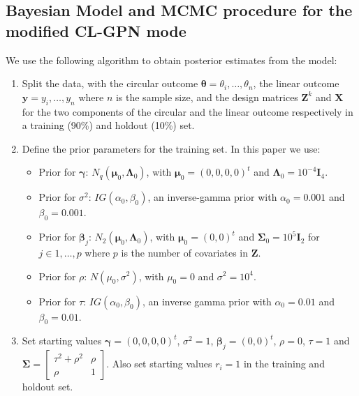 \documentclass[11pt,]{article}
\begin{document}
\begin{appendices}
\newpage
\subsection{Bayesian Model and MCMC procedure for the modified CL-GPN mode}\label{A2}

We use the following algorithm to obtain posterior estimates from the model:

\begin{enumerate}

\item Split the data, with the circular outcome $\boldsymbol{\theta} = \theta_i, \dots, \theta_n$, the linear outcome $\boldsymbol{y} = y_i, \dots, y_n$ where $n$ is the sample size, and the design matrices $\boldsymbol{Z}^k$ and $\boldsymbol{X}$ for the two components of the circular and the linear outcome respectively in a training (90\%) and holdout (10\%) set.

\item Define the prior parameters for the training set. In this paper we use:

\begin{itemize}
\item Prior for $\boldsymbol{\gamma}$: $N_q(\boldsymbol{\mu}_{0}, \boldsymbol{\Lambda}_{0})$, with $\boldsymbol{\mu}_{0} = (0,0,0,0)^t$ and $\boldsymbol{\Lambda}_{0} = 10^{-4}\boldsymbol{I}_4$.
\item Prior for $\sigma^2$: $IG(\alpha_{0}, \beta_{0})$, an inverse-gamma prior with $\alpha_{0} = 0.001$ and $\beta_{0} = 0.001$.
\item Prior for $\boldsymbol{\beta}_{j}$: $N_2(\boldsymbol{\mu}_{0}, \boldsymbol{\Lambda}_0)$, with $\boldsymbol{\mu}_{0} = (0,0)^t$ and  $\boldsymbol{\Sigma}_{0} = 10^{5}\boldsymbol{I}_2$ for $j \in 1, \dots, p$ where $p$ is the number of covariates in $\boldsymbol{Z}$.
\item Prior for $\rho$: $N(\mu_0, \sigma^2)$, with $\mu_0 = 0$ and $\sigma^2 = 10^{4}$.
\item Prior for $\tau$: $IG(\alpha_{0}, \beta_{0})$, an inverse gamma prior with $\alpha_{0} = 0.01$ and $\beta_{0} = 0.01$.
\end{itemize}


\item Set starting values $\boldsymbol{\gamma} = (0,0,0,0)^t$, $\sigma^2 = 1$, $\boldsymbol{\beta}_j = (0,0)^t$, $\rho = 0$, $\tau = 1$ and $\boldsymbol{\Sigma} = \begin{bmatrix} \tau^2 + \rho^2 & \rho\\ \rho & 1 \end{bmatrix}$. Also set starting values $r_i = 1$ in the training and holdout set. 


\end{enumerate}
\end{appendices}
\end{document}
